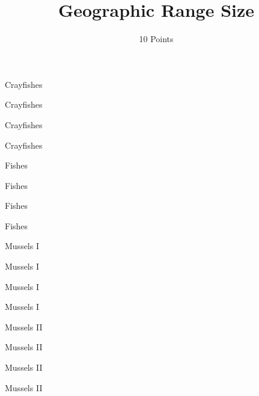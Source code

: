 \documentclass[11pt]{article}
\title{Geographic Range Size}
\author{10 Points}
\date{}                                           %
\begin{document}
\thispagestyle{empty}
\begin{multicols}{2}
{\LARGE
Crayfishes\vspace{2\baselineskip}

Crayfishes\vspace{2\baselineskip}

Crayfishes\vspace{2\baselineskip}

Crayfishes\vspace{2\baselineskip}

Fishes\vspace{2\baselineskip}

Fishes\vspace{2\baselineskip}

Fishes\vspace{2\baselineskip}

Fishes\vspace{2\baselineskip}

Mussels I\vspace{2\baselineskip}

Mussels I\vspace{2\baselineskip}

Mussels I\vspace{2\baselineskip}

Mussels I\vspace{2\baselineskip}

Mussels II\vspace{2\baselineskip}

Mussels II\vspace{2\baselineskip}

Mussels II\vspace{2\baselineskip}

Mussels II\vspace{2\baselineskip}
}

\end{multicols}
\end{document}
